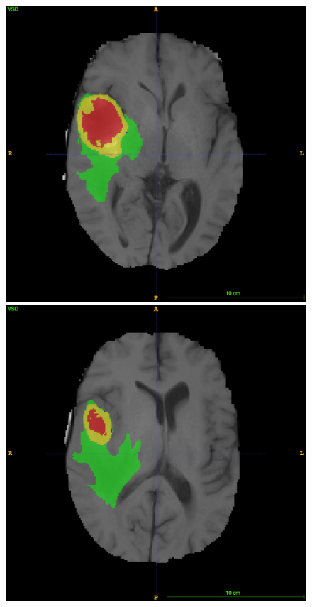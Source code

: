 \documentclass[12pt,a4paper,twoside,openright]{report}
\begin{document}
\begin{figure}
	\includegraphics[scale=0.1]{expert_segmentation_89}
	\includegraphics[scale=0.1]{expert_segmentation_99}

\end{figure}
\end{document}

